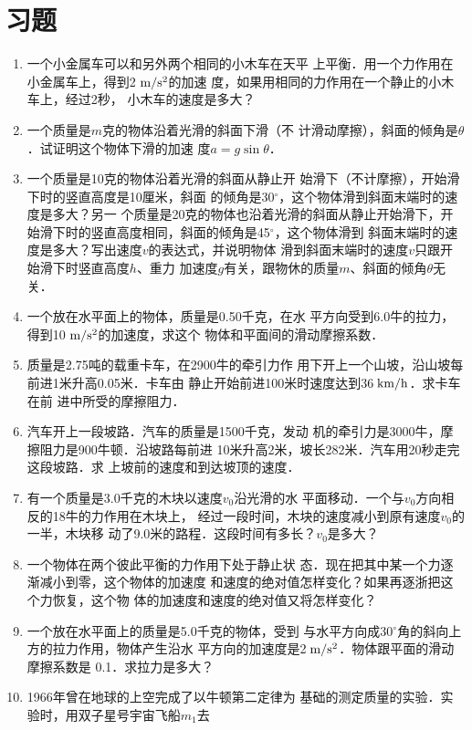\section*{习题}
\begin{enumerate}
    \item 一个小金属车可以和另外两个相同的小木车在天平
上平衡．用一个力作用在小金属车上，得到2$\;\text{m}/\text{s}^2$的加速
度，如果用相同的力作用在一个静止的小木车上，经过2秒，
小木车的速度是多大？

\item  一个质量是$m$克的物体沿着光滑的斜面下滑（不
计滑动摩擦），斜面的倾角是$\theta$．试证明这个物体下滑的加速
度$a=g\sin\theta$．
\item  一个质量是10克的物体沿着光滑的斜面从静止开
始滑下（不计摩擦），开始滑下时的竖直高度是10厘米，斜面
的倾角是30$^\circ$，这个物体滑到斜面末端时的速度是多大？另一
个质量是20克的物体也沿着光滑的斜面从静止开始滑下，开
始滑下时的竖直高度相同，斜面的倾角是45$^\circ$，这个物体滑到
斜面末端时的速度是多大？写出速度$v$的表达式，并说明物体
滑到斜面末端时的速度$v$只跟开始滑下时竖直高度$h$、重力
加速度$g$有关，跟物休的质量$m$、斜面的倾角$\theta$无关．
\item  一个放在水平面上的物体，质量是0.50千克，在水
平方向受到6.0牛的拉力，得到10$\;\text{m}/\text{s}^2$的加速度，求这个
物体和平面间的滑动摩擦系数．
\item   质量是2.75吨的载重卡车，在2900牛的牵引力作
用下开上一个山坡，沿山坡每前进1米升高0.05米．卡车由
静止开始前进100米时速度达到36$\;\text{km}/\text{h}$．求卡车在前
进中所受的摩擦阻力．
\item  汽车开上一段坡路．汽车的质量是1500千克，发动
机的牵引力是3000牛，摩擦阻力是900牛顿．沿坡路每前进
10米升高2米，坡长282米．汽车用20秒走完这段坡路．求
上坡前的速度和到达坡顶的速度．
\item  有一个质量是3.0千克的木块以速度$v_0$沿光滑的水
平面移动．一个与$v_0$方向相反的18牛的力作用在木块上，
经过一段时间，木块的速度减小到原有速度$v_0$的一半，木块移
动了9.0米的路程．这段时间有多长？$v_0$是多大？
\item  一个物体在两个彼此平衡的力作用下处于静止状
态．现在把其中某一个力逐渐减小到零，这个物体的加速度
和速度的绝对值怎样变化？如果再逐浙把这个力恢复，这个物
体的加速度和速度的绝对值又将怎样变化？
\item  一个放在水平面上的质量是5.0千克的物体，受到
与水平方向成30$^{\circ}$角的斜向上方的拉力作用，物体产生沿水
平方向的加速度是2$\;\text{m}/\text{s}^2$．物体跟平面的滑动摩擦系数是
0.1．求拉力是多大？
\item  1966年曾在地球的上空完成了以牛顿第二定律为
基础的测定质量的实验．实验时，用双子星号宇宙飞船$m_1$去

\end{enumerate}
